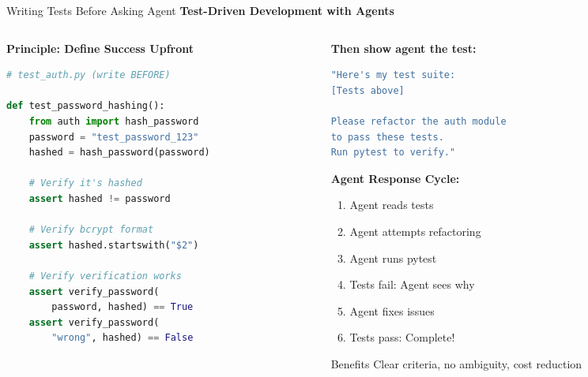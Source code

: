 \documentclass[aspectratio=169,11pt]{beamer}
\begin{document}
\begin{frame}[fragile]{Writing Tests Before Asking Agent}
    \textbf{Test-Driven Development with Agents}

    \begin{columns}[T]
        \begin{column}{0.48\textwidth}
            \textbf{Principle: Define Success Upfront}
            \begin{lstlisting}[language=Python]
# test_auth.py (write BEFORE)

def test_password_hashing():
    from auth import hash_password
    password = "test_password_123"
    hashed = hash_password(password)

    # Verify it's hashed
    assert hashed != password

    # Verify bcrypt format
    assert hashed.startswith("$2")

    # Verify verification works
    assert verify_password(
        password, hashed) == True
    assert verify_password(
        "wrong", hashed) == False
            \end{lstlisting}
        \end{column}
        \begin{column}{0.48\textwidth}
            \textbf{Then show agent the test:}
            \begin{lstlisting}[language=Bash]
"Here's my test suite:
[Tests above]

Please refactor the auth module
to pass these tests.
Run pytest to verify."
            \end{lstlisting}

            \textbf{Agent Response Cycle:}
            \begin{enumerate}
                \item Agent reads tests
                \item Agent attempts refactoring
                \item Agent runs pytest
                \item Tests fail: Agent sees why
                \item Agent fixes issues
                \item Tests pass: Complete!
            \end{enumerate}

            \begin{block}{Benefits}
                Clear criteria, no ambiguity, cost reduction
            \end{block}
        \end{column}
    \end{columns}
\end{frame}
\end{document}
